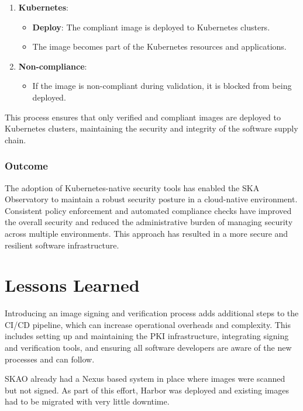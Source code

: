\documentclass[a4paper]{spie}  %
\begin{document}
\begin{enumerate}
    \item \textbf{Kubernetes}:
    \begin{itemize}
        \item \textbf{Deploy}: The compliant image is deployed to Kubernetes clusters.
        \item The image becomes part of the Kubernetes resources and applications.
    \end{itemize}
    
    \item \textbf{Non-compliance}:
    \begin{itemize}
        \item If the image is non-compliant during validation, it is blocked from being deployed.
    \end{itemize}
\end{enumerate}

This process ensures that only verified and compliant images are deployed to Kubernetes clusters, maintaining the security and integrity of the software supply chain.

\subsubsection{Outcome}

The adoption of Kubernetes-native security tools has enabled the SKA Observatory to maintain a robust security posture in a cloud-native environment. Consistent policy enforcement and automated compliance checks have improved the overall security and reduced the administrative burden of managing security across multiple environments. This approach has resulted in a more secure and resilient software infrastructure.

\section{Lessons Learned}

Introducing an image signing and verification process adds additional steps to the CI/CD pipeline, which can increase operational overheads and complexity. This includes setting up and maintaining the PKI infrastructure, integrating signing and verification tools, and ensuring all software developers are aware of the new processes and can follow.

SKAO already had a Nexus based system in place where images were scanned but not signed. As part of this effort, Harbor was deployed and existing images had to be migrated with very little downtime. 
\end{document}
